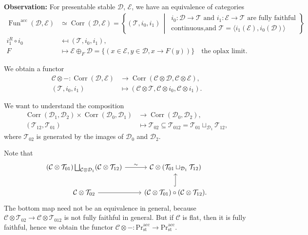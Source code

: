\documentclass[draft]{amsart}
\newcommand{\set}[2]{\left\{#1\,\middle|\,#2\right\}}
\newcommand{\cat}[1]{\mathcal{#1}}
\renewcommand{\Pr}{\mathrm{Pr}}
\newcommand{\blank}{-} %
\DeclareMathOperator{\Fun}{Fun}
\DeclareMathOperator{\Corr}{Corr}
\theoremstyle{definition}
\begin{document}
\textbf{Observation:} For presentable stable $\cat D$, $\cat E$, we have an equivalence of categories
\begin{align*}
\Fun^{\mathrm{acc}}(\cat D, \cat E) &\simeq \Corr(\cat D, \cat E) = \set{(\cat T,i_0,i_1)}{\begin{array}{l} \text{$i_0\colon \cat D\to \cat T$ and $i_1\colon \cat E\to \cat T$ are fully faithful} \\
\text{continuous,and $\cat T = \langle i_1(\cat E), i_0(\cat D)\rangle$}
\end{array}} \\
i_1^R\circ i_0 &\mapsfrom (\cat T,i_0,i_1), \\
F &\mapsto \cat E\oplus_{F}\cat D = \{(x\in \cat E, y\in \cat D, x\to F(y))\}
\quad \text{the oplax limit}.
\end{align*}

We obtain a functor
\begin{align*}
\cat C\otimes\blank \colon \Corr(\cat D, \cat E) &\to \Corr(\cat C\otimes \cat D, \cat C\otimes \cat E), \\
(\cat T, i_0, i_1) &\mapsto (\cat C\otimes \cat T, \cat C\otimes i_0, \cat C\otimes i_1).
\end{align*}

We want to understand the composition
\begin{align*}
\Corr(\cat D_1,\cat D_2) \times \Corr(\cat D_0, \cat D_1) &\to \Corr(\cat D_0, \cat D_2), \\
(\cat T_{12}, \cat T_{01}) &\mapsto \cat T_{02} \subseteq \cat T_{012} = \cat T_{01} \sqcup_{\cat D_1} \cat T_{12},
\end{align*}
where $\cat T_{02}$ is generated by the images of $\cat D_0$ and $\cat D_2$.

Note that
\[
\begin{tikzcd}
(\cat C\otimes \cat T_{01}) \bigsqcup_{\cat C\otimes \cat D_1} (\cat C\otimes \cat T_{12}) \ar[r,"\sim"] & \cat C \otimes (\cat T_{01} \sqcup_{\cat D_1} \cat T_{12}) \\
\cat C\otimes \cat T_{02} \ar[r] & (\cat C\otimes \cat T_{01}) \circ (\cat C\otimes \cat T_{12}) \ar[u,hook].
\end{tikzcd}
\]
The bottom map need not be an equivalence in general, because $\cat C\otimes \cat T_{02} \to \cat C\otimes \cat T_{012}$ is not fully faithful in general. But if $\cat C$ is flat, then it is fully faithful, hence we obtain the functor $\cat C\otimes \blank \colon \Pr^{\mathrm{acc}}_{\mathrm{st}} \to \Pr^{\mathrm{acc}}_{\mathrm{st}}$.
\end{document}
